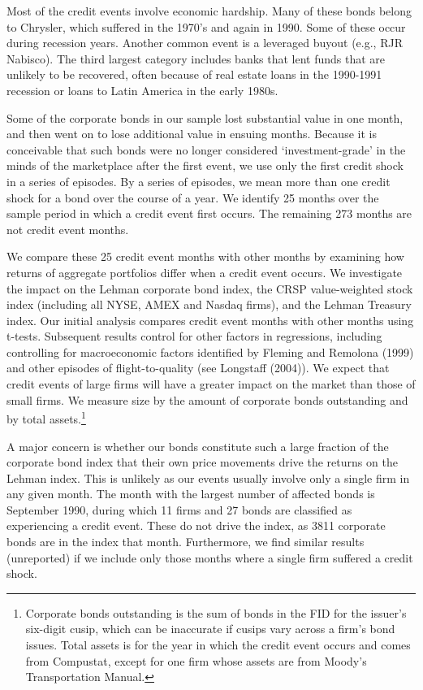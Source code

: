 \documentclass[titlepage,11pt]{article}
\begin{document}
Most of the credit events involve economic hardship. Many of these bonds belong
to Chrysler, which
suffered in the 1970's and again in 1990. Some of these occur during recession
years.
Another common event is a leveraged buyout (e.g., RJR Nabisco). The third
largest category includes banks that lent
funds that are unlikely to be recovered, often because of real estate loans in
the 1990-1991 recession
or loans to Latin America in the early 1980s.

Some of the corporate bonds in our sample lost substantial value in
one month, and then went on to lose additional value in ensuing
months. Because it is conceivable that such bonds were no longer
considered `investment-grade' in the minds of the marketplace after
the first event, we use only the first credit shock in a series of
episodes. By a series of episodes, we mean more than one credit
shock for a bond over the course of a year.  We identify 25 months
over the sample period in which a credit event first occurs. The remaining
273 months are not credit event months.

We compare these 25 credit event months with other months by
examining how returns of aggregate portfolios differ when a credit event
occurs. We
investigate the impact on the Lehman corporate bond index, the CRSP
value-weighted stock index
(including all NYSE, AMEX and Nasdaq firms), and the Lehman
Treasury index.  Our initial analysis compares credit event months with other
months
using t-tests. Subsequent results
control for other factors in regressions, including controlling for
macroeconomic factors identified by Fleming and Remolona (1999)\nocite{flere99}
and other
episodes of flight-to-quality (see Longstaff (2004)).
We expect that credit events of large firms will have a greater impact on the
market than those of small firms. We measure size by the amount of corporate
bonds outstanding and by
total assets.\footnote{Corporate bonds outstanding is the sum of bonds in the
FID
for the issuer's six-digit cusip, which can be inaccurate if cusips vary across
a firm's bond issues.
Total assets is for the year in which the
credit event occurs and comes from Compustat, except for one
firm whose assets are from Moody's Transportation Manual.}

A major concern is whether our bonds constitute such a
large fraction of the corporate bond index that their own price
movements drive the returns on the Lehman index. This is unlikely as our events
usually involve only a single firm in any given month. The month with the
largest number of affected bonds is
September 1990, during which 11 firms and 27 bonds are classified
as experiencing a credit event. These do not drive the index, as
3811 corporate bonds are in the index that month.
Furthermore, we find similar results (unreported) if we include only
those months where a single firm suffered a credit shock.
\end{document}
